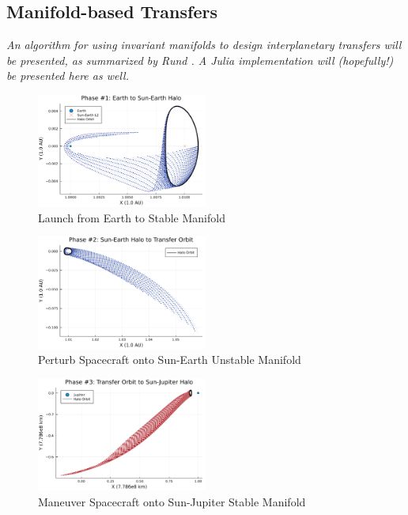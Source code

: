 \documentclass[conf]{new-aiaa}
\begin{document}
\begin{multicols}{2}
\section{Manifold-based Transfers}

\textit{
    An algorithm for using invariant manifolds to 
    design interplanetary transfers will be presented,
    as summarized by Rund \cite{rund2018interplanetary}.
    A Julia implementation will (hopefully!) be presented
    here as well.
}

\begin{figure}[H]
    \hskip -0.3cm
    \includegraphics[width=0.5\textwidth]{manifold_transfer_phase1.png}
    \caption{Launch from Earth to Stable Manifold}
\end{figure}

\begin{figure}[H]
    \hskip -0.3cm
    \includegraphics[width=0.5\textwidth]{manifold_transfer_phase2.png}
    \caption{Perturb Spacecraft onto Sun-Earth Unstable Manifold}
\end{figure}

\begin{figure}[H]
    \hskip -0.3cm
    \includegraphics[width=0.5\textwidth]{manifold_transfer_phase3.png}
    \caption{Maneuver Spacecraft onto Sun-Jupiter Stable Manifold}
\end{figure}


\end{multicols}
\end{document}
